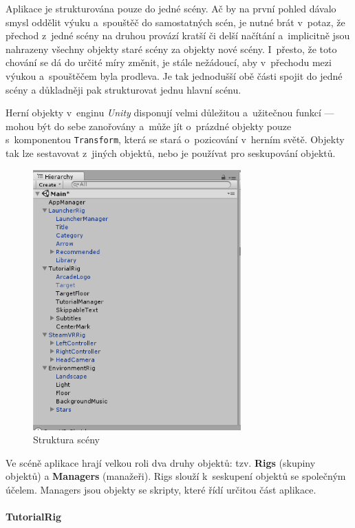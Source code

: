 Aplikace je strukturována pouze do jedné scény. Ač by na první pohled
dávalo smysl oddělit výuku a~spouštěč do samostatných scén, je nutné
brát v~potaz, že přechod z~jedné scény na druhou provází kratší či delší
načítání a~implicitně jsou nahrazeny všechny objekty staré scény za
objekty nové scény. I~přesto, že toto chování se dá do určité míry
změnit, je stále nežádoucí, aby v~přechodu mezi výukou a~spouštěčem
byla prodleva. Je tak jednodušší obě části spojit do jedné scény a
důkladněji pak strukturovat jednu hlavní scénu.

Herní objekty v~enginu \emph{Unity} disponují velmi důležitou a~užitečnou
funkcí --- mohou být do sebe zanořovány a~může jít o~prázdné objekty
pouze s~komponentou \texttt{Transform}, která se stará o~pozicování
v~herním světě. Objekty tak lze sestavovat z~jiných objektů, nebo je
používat pro seskupování objektů.

\newpage

\begin{figure}[h!]
\centering
\includegraphics[height=10cm]{src/assets/structure.png}
\caption{Struktura scény}
\end{figure}

Ve scéně aplikace hrají velkou roli dva druhy objektů: tzv.
\textbf{Rigs} (skupiny objektů) a \textbf{Managers} (manažeři). Rigs
slouží k~seskupení objektů se společným účelem. Managers jsou 
objekty se skripty, které řídí určitou část aplikace.

\paragraph{TutorialRig}\label{tutorialrig}

